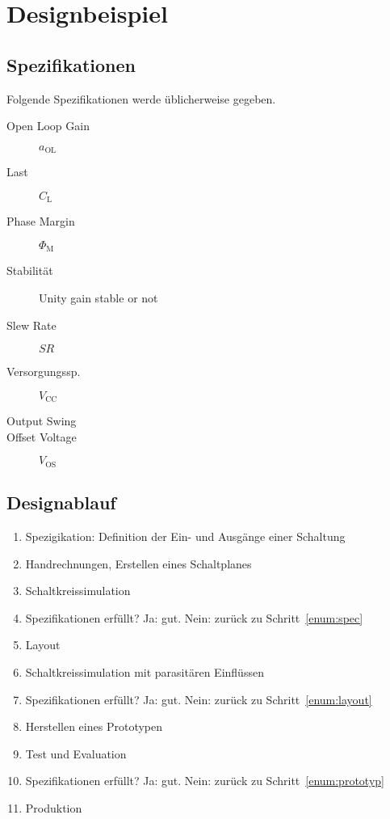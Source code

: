 \section{Designbeispiel}
\subsection{Spezifikationen}
Folgende Spezifikationen werde üblicherweise gegeben.
\begingroup
\setlength{\columnseprule}{0pt}
\begin{multicols}{2}
    \begin{description}
        \item[Open Loop Gain] $a_\text{OL}$
        \item[Last] $C_\text{L}$
        \item[Phase Margin] $\Phi_\text{M}$
        \item[Stabilität] Unity gain stable or not
        \item[Slew Rate] $SR$
        \item[Versorgungssp.] $V_\text{CC}$
        \item[Output Swing]
        \item[Offset Voltage] $V_\text{OS}$
    \end{description}
\end{multicols}
\endgroup

\subsection{Designablauf}
\begin{enumerate}
    \item Spezigikation: Definition der Ein- und Ausgänge einer Schaltung\label{enum:spec}
    \item Handrechnungen, Erstellen eines Schaltplanes
    \item Schaltkreissimulation
    \item Spezifikationen erfüllt? Ja: gut. Nein: zurück zu Schritt~\ref{enum:spec}
    \item Layout\label{enum:layout}
    \item Schaltkreissimulation mit parasitären Einflüssen
    \item Spezifikationen erfüllt? Ja: gut. Nein: zurück zu Schritt~\ref{enum:layout}
    \item Herstellen eines Prototypen\label{enum:prototyp}
    \item Test und Evaluation
    \item Spezifikationen erfüllt? Ja: gut. Nein: zurück zu Schritt~\ref{enum:prototyp}
    \item Produktion
\end{enumerate}

